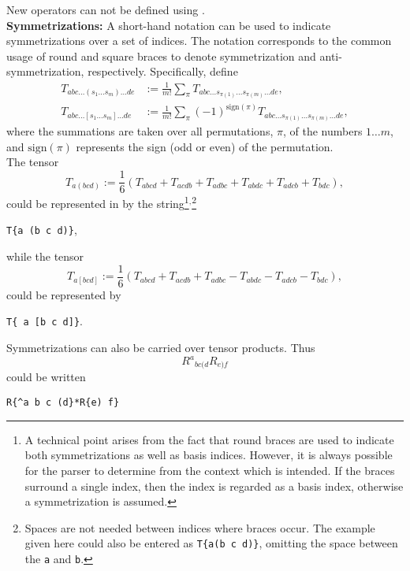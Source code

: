 \documentclass{article}
\begin{document}
New operators can not be defined using .\\

\noindent\textbf{Symmetrizations:} A short-hand notation can be used to 
indicate symmetrizations over a set of indices. The notation
corresponds to the common usage of round and square braces
to denote symmetrization and anti-symmetrization, respectively.
Specifically, define
\begin{align*}
  T_{abc \ldots (s_1 \ldots s_m) \ldots de} & 
    := \frac{1}{m!} \sum_\pi 
    T_{abc\ldots s_{\pi(1)} \ldots s_{\pi(m)} \ldots de},\\
  T_{abc \ldots [s_1 \ldots s_m] \ldots de} &
    := \frac{1}{m!} \sum_\pi (-1)^{\text{sign}(\pi)}
    T_{abc \ldots s_{\pi(1)} \ldots s_{\pi(m)} \ldots de},
\end{align*}
where the summations are taken over all permutations, $\pi$, of the
numbers $1\ldots m$, and $\text{sign}(\pi)$ represents the sign (odd or
even) of the permutation.\\

The tensor
\[
  T_{a(bcd)} := \frac{1}{6}\left( T_{abcd} + T_{acdb} + T_{adbc} +
    T_{abdc} + T_{adcb} + T_{bdc} \right), 
\]
could be represented in  by the string\footnote{A
technical point arises from the fact that round braces are used to
indicate both symmetrizations as well as basis indices. However, it is
always possible for the parser to determine from the context which is
intended. If the braces surround a single index, then the index is
regarded as a basis index, otherwise a symmetrization is
assumed.}${}^,$\footnote{Spaces are not needed between indices where
braces occur. The example given here could also be entered as
\texttt{T\{a(b c d)\}}, omitting the space between the \texttt{a} and
\texttt{b}.}
\begin{center}
  \texttt{T\{a (b c d)\}},
\end{center}
while the tensor
\[
  T_{a[bcd]} := \frac{1}{6} \left(
   T_{abcd} + T_{acdb} + T_{adbc} - T_{abdc} - T_{adcb} - T_{bdc} \right),
\]
could be represented by
\begin{center}
  \texttt{T\{ a [b c d]\}}.
\end{center}

Symmetrizations can also be carried over tensor products. Thus
\[
  R^a{}_{bc(d}R_{e)f}
\]
could be written
\begin{center}
  \texttt{R\{\^{}a b c (d\}*R\{e) f\}}
\end{center}
\end{document}
